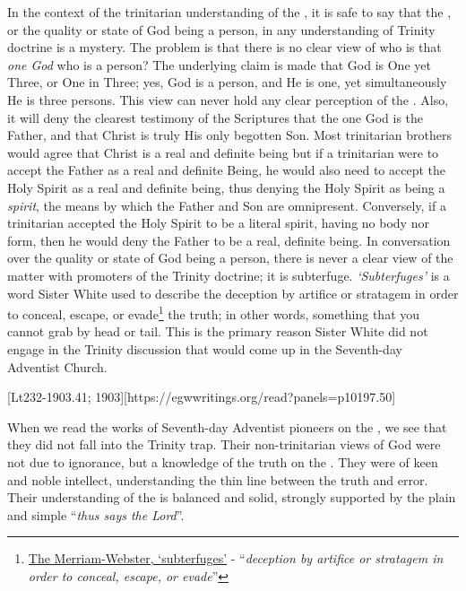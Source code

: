 In the context of the trinitarian understanding of the , it is safe to say that the , or the quality or state of God being a person, in any understanding of Trinity doctrine is a mystery. The problem is that there is no clear view of who is that \textit{one God} who is a person? The underlying claim is made that God is One yet Three, or One in Three; yes, God is a person, and He is one, yet simultaneously He is three persons. This view can never hold any clear perception of the . Also, it will deny the clearest testimony of the Scriptures that the one God is the Father, and that Christ is truly His only begotten Son. Most trinitarian brothers would agree that Christ is a real and definite being but if a trinitarian were to accept the Father as a real and definite Being, he would also need to accept the Holy Spirit as a real and definite being, thus denying the Holy Spirit as being a \textit{spirit}, the means by which the Father and Son are omnipresent. Conversely, if a trinitarian accepted the Holy Spirit to be a literal spirit, having no body nor form, then he would deny the Father to be a real, definite being. In conversation over the quality or state of God being a person, there is never a clear view of the matter with promoters of the Trinity doctrine; it is subterfuge. \textit{‘Subterfuges’} is a word Sister White used to describe the deception by artifice or stratagem in order to conceal, escape, or evade\footnote{\href{https://www.merriam-webster.com/dictionary/subterfuges}{The Merriam-Webster, ‘subterfuges’} - “\textit{deception by artifice or stratagem in order to conceal, escape, or evade}”} the truth; in other words, something that you cannot grab by head or tail. This is the primary reason Sister White did not engage in the Trinity discussion that would come up in the Seventh-day Adventist Church.

[Lt232-1903.41; 1903][https://egwwritings.org/read?panels=p10197.50]

When we read the works of Seventh-day Adventist pioneers on the , we see that they did not fall into the Trinity trap. Their non-trinitarian views of God were not due to ignorance, but a knowledge of the truth on the . They were of keen and noble intellect, understanding the thin line between the truth and error. Their understanding of the  is balanced and solid, strongly supported by the plain and simple “\textit{thus says the Lord}”.


